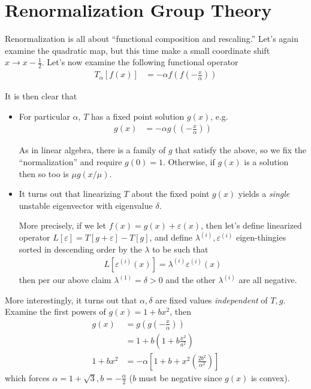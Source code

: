 \documentclass[12pt]{article}
\begin{document}
\clearpage
\section{Renormalization Group Theory}

Renormalization is all about ``functional composition and rescaling.'' Let's
again examine the quadratic map, but this time make a small coordinate shift
$x \to x - \frac{1}{2}$. Let's now examine the following functional operator
\begin{align}
    T_\alpha[f(x)] &= -\alpha f\left( f\left( -\frac{x}{\alpha} \right) \right)
\end{align}

It is then clear that
\begin{itemize}
    \item For particular $\alpha$, $T$ has a fixed point solution $g(x)$, e.g.
        \begin{align}
            g(x) &= -\alpha g\left( \left( -\frac{x}{\alpha} \right) \right)
        \end{align}

        As in linear algebra, there is a family of $g$ that satisfy the above,
        so we fix the ``normalization'' and require $g(0) = 1$. Otherwise, if
        $g(x)$ is a solution then so too is $\mu g(x/\mu)$.

    \item It turns out that linearizing $T$ about the fixed point $g(x)$ yields
        a \emph{single} unstable eigenvector with eigenvalue $\delta$.

        More precisely, if we let $f(x) = g(x) + \varepsilon(x)$, then let's define
        linearized operator $L[\varepsilon] = T[g+\varepsilon] - T[g]$, and define
        $\lambda^{(i)}, \varepsilon^{(i)}$ eigen-thingies sorted in descending order
        by the $\lambda$ to be such that
        \begin{align}
            L[\varepsilon^{(i)}(x)] = \lambda^{(i)}\varepsilon^{(i)}(x)
        \end{align}
        then per our above claim $\lambda^{(1)} = \delta > 0$ and the other
        $\lambda^{(i)}$ are all negative.
\end{itemize}

More interestingly, it turns out that $\alpha, \delta$ are fixed values
\emph{independent} of $T, g$. Examine the first powers of $g(x) = 1 + bx^2$,
then
\begin{align}
    g(x) &= g\left( g\left( -\frac{x}{\alpha} \right) \right)\\
    &= 1 + b\left( 1 + b\frac{x^2}{a^2} \right)\\
    1 + bx^2 &= -\alpha
    \left[
        1 + b + x^2\left( \frac{2b^2}{\alpha^2} \right)
    \right]
\end{align}
which forces $\alpha = 1 + \sqrt{3}, b = -\frac{\alpha}{2}$ ($b$ must be
negative since $g(x)$ is convex).
\end{document}
